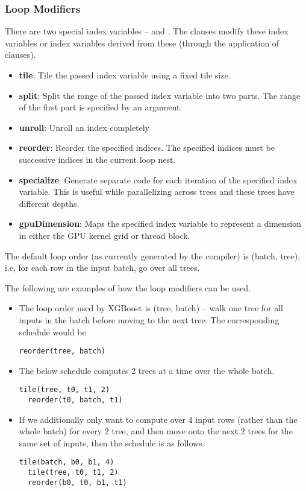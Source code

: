 \subsubsection{Loop Modifiers}
There are two special index variables --  and . The clauses modify these index variables or 
index variables derived from these (through the application of clauses).
\begin{itemize}
  \item \textbf{tile}: Tile the passed index variable using a fixed tile size.
  \item \textbf{split}: Split the range of the passed index variable into two parts. The range of the first part is specified
  by an argument.
  \item \textbf{unroll}: Unroll an index completely
  \item \textbf{reorder}: Reorder the specified indices. The specified indices must be successive indices in the current loop nest.
  \item \textbf{specialize}: Generate separate code for each iteration of the specified index variable. This is useful 
  while parallelizing across trees and these trees have different depths.
  \item \textbf{gpuDimension}: Maps the specified index variable to represent a dimension in either the GPU kernel grid or thread block.
\end{itemize}

The default loop order (as currently generated by the compiler) is (batch, tree), i.e, for each row in the input batch, go over all trees.

The following are examples of how the loop modifiers can be used.
\begin{itemize}
  \item The loop order used by XGBoost\cite{XGBoost} is (tree, batch) -- walk one tree for all inputs in the batch before 
  moving to the next tree. The corresponding schedule would be
\begin{lstlisting}[style=c++]
  reorder(tree, batch)
\end{lstlisting}

  \item The below schedule computes 2 trees at a time over the whole batch.
\begin{lstlisting}[style=c++]
  tile(tree, t0, t1, 2)
  reorder(t0, batch, t1)
\end{lstlisting}

  \item If we additionally only want to compute over 4 input rows (rather than the whole batch) for
  every 2 tree, and then move onto the next 2 trees for the same set of inputs, then the schedule is as follows. 
\begin{lstlisting}[style=c++]
  tile(batch, b0, b1, 4) 
  tile(tree, t0, t1, 2)
  reorder(b0, t0, b1, t1) 
\end{lstlisting}

\end{itemize}

